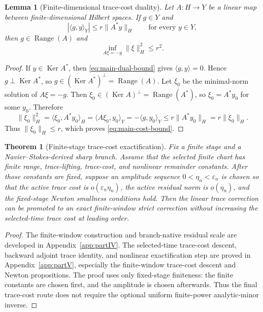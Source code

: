 \documentclass[11pt]{article}
\numberwithin{equation}{section}
\theoremstyle{plain}
\newtheorem{theorem}{Theorem}[section]
\newtheorem{lemma}{Lemma}[section]
\theoremstyle{definition}
\theoremstyle{remark}
\DeclareMathOperator{\Range}{Range}
\DeclareMathOperator{\Ker}{Ker}
\newcommand{\eps}{\varepsilon}
\begin{document}
\begin{lemma}[Finite-dimensional trace-cost duality]\label{lem:main-trace-duality}
Let \(A:H\to Y\) be a linear map between finite-dimensional Hilbert spaces.  If \(g\in Y\) and
\begin{equation}\label{eq:main-dual-bound}
        |\langle g,y\rangle_Y|\le r\|A^*y\|_H
        \qquad \text{for every }y\in Y,
\end{equation}
then \(g\in\Range(A)\) and
\begin{equation}\label{eq:main-cost-bound}
        \inf_{A\xi=-g}\|\xi\|_H^2\le r^2.
\end{equation}
\end{lemma}

\begin{proof}
If \(y\in\Ker A^*\), then \eqref{eq:main-dual-bound} gives \(\langle g,y\rangle=0\).  Hence \(g\perp\Ker A^*\), so \(g\in(\Ker A^*)^\perp=\Range(A)\).  Let \(\xi_0\) be the minimal-norm solution of \(A\xi=-g\).  Then \(\xi_0\in(\Ker A)^\perp=\Range(A^*)\), so \(\xi_0=A^*y_0\) for some \(y_0\).  Therefore
\[
        \|\xi_0\|_H^2
        =\langle \xi_0,A^*y_0\rangle_H
        =\langle A\xi_0,y_0\rangle_Y
        =-\langle g,y_0\rangle_Y
        \le r\|A^*y_0\|_H
        =r\|\xi_0\|_H.
\]
Thus \(\|\xi_0\|_H\le r\), which proves \eqref{eq:main-cost-bound}.
\end{proof}

\begin{theorem}[Finite-stage trace-cost exactification]\label{thm:main-exactification}
Fix a finite stage and a Navier--Stokes-derived sharp branch.  Assume that the selected finite chart has finite range, trace-lifting, trace-cost, and nonlinear remainder constants.  After those constants are fixed, suppose an amplitude sequence \(0<\eta_n<\eps_n\) is chosen so that the active trace cost is \(o(\eps_n\eta_n)\), the active residual norm is \(o(\eta_n)\), and the fixed-stage Newton smallness conditions hold.  Then the linear trace correction can be promoted to an exact finite-window strict correction without increasing the selected-time trace cost at leading order.
\end{theorem}

\begin{proof}
The finite-window construction and branch-native residual scale are developed in Appendix~\ref{app:partIV}.  The selected-time trace-cost descent, backward adjoint trace identity, and nonlinear exactification step are proved in Appendix~\ref{app:partV}, especially the finite-window trace-cost descent and Newton propositions.  The proof uses only fixed-stage finiteness: the finite constants are chosen first, and the amplitude is chosen afterwards.  Thus the final trace-cost route does not require the optional uniform finite-power analytic-minor inverse.
\end{proof}
\end{document}
